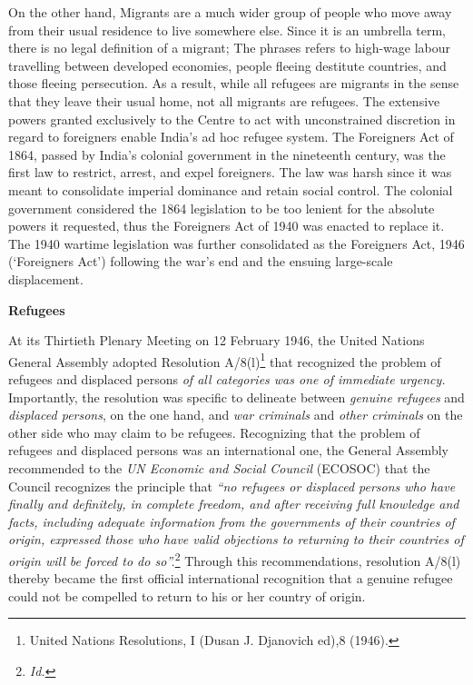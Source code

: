 \begin{multicols}{2}
\vspace{-.15cm}

\noi
On the other hand, Migrants are a much wider group of people who move away from their
usual residence to live somewhere else. Since it is an umbrella term, there is no legal
definition of a migrant; The phrases refers to high-wage labour travelling between developed
economies, people fleeing destitute countries, and those fleeing persecution. As a result,
while all refugees are migrants in the sense that they leave their usual home, not all migrants
are refugees. The extensive powers granted exclusively to the Centre to act with
unconstrained discretion in regard to foreigners enable India's ad hoc refugee system. The
Foreigners Act of 1864, passed by India's colonial government in the nineteenth century, was
the first law to restrict, arrest, and expel foreigners. The law was harsh since it was meant to
consolidate imperial dominance and retain social control. The colonial government
considered the 1864 legislation to be too lenient for the absolute powers it requested, thus the
Foreigners Act of 1940 was enacted to replace it. The 1940 wartime legislation was further
consolidated as the Foreigners Act, 1946 (‘Foreigners Act') following the war's end and the
ensuing large-scale displacement.

\vspace{.2cm}


\vspace{.1cm}

\noi
{\normalsize\bfseries {Refugees}}

\vspace{-.2cm}

\noi
At its Thirtieth Plenary Meeting on 12 February 1946, the United Nations General Assembly
adopted Resolution A/8(l)\footnote{United Nations Resolutions, I (Dusan J. Djanovich ed),8 (1946).} that recognized the problem of refugees and displaced persons \textit{of
all categories was one of immediate urgency.} Importantly, the resolution was specific to
delineate between \textit{genuine refugees} and \textit{displaced persons}, on the one hand, and \textit{war
criminals} and \textit{other criminals} on the other side who may claim to be refugees.
Recognizing that the problem of refugees and displaced persons was an international one, the
General Assembly recommended to the \textit{UN Economic and Social Council} (ECOSOC) that the
Council recognizes the principle that \textit{“no refugees or displaced persons who have finally and
definitely, in complete freedom, and after receiving full knowledge and facts, including
adequate information from the governments of their countries of origin, expressed those who
have valid objections to returning to their countries of origin will be forced to do so”.}\footnote{\textit{Id.}}
Through this recommendations, resolution A/8(l) thereby became the first official
international recognition that a genuine refugee could not be compelled to return to his or her
country of origin. 


\end{multicols}
